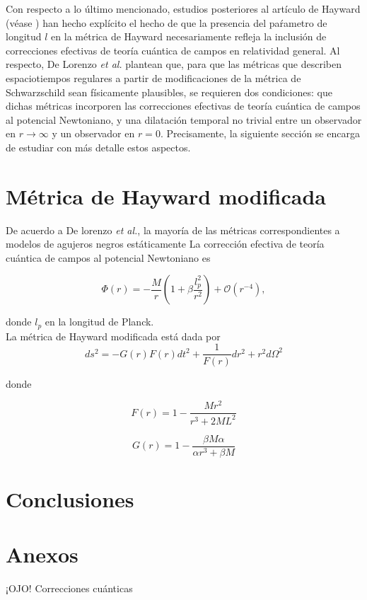 \documentclass{article}
\numberwithin{equation}{section}
\theoremstyle{definition}
\begin{document}
Con respecto a lo último mencionado, estudios posteriores al artículo de Hayward (véase \cite{lorenzo}) han hecho explícito el hecho de que la presencia del paŕametro de longitud $l$ en la métrica de Hayward necesariamente refleja la inclusión de correcciones efectivas de teoría cuántica de campos en relatividad general. Al respecto, De Lorenzo \emph{et al.} plantean que, para que las métricas que describen espaciotiempos regulares a partir de modificaciones de la métrica de Schwarzschild sean físicamente plausibles, se requieren dos condiciones: que dichas métricas incorporen las correcciones efectivas de teoría cuántica  de campos al potencial Newtoniano, y una dilatación temporal no trivial entre un observador en $r \to \infty$ y un observador en $r = 0$. Precisamente, la siguiente sección se encarga de estudiar con más detalle estos aspectos.

\section{Métrica de Hayward modificada}

De acuerdo a De lorenzo \emph{et al.}, la mayoría de las métricas correspondientes a modelos de agujeros negros estáticamente
La corrección efectiva de teoría cuántica de campos al potencial Newtoniano es

\begin{equation}
\label{newF}
\Phi (r) = -\frac{M}{r} \left( 1 + \beta \frac{l_{p}^2}{r^2} \right) + \mathcal{O}(r^{-4}),
\end{equation}

donde $l_{p}$ en la longitud de Planck.\\

La métrica de Hayward modificada está dada por 
\begin{equation}
\label{reg-schF}
ds^2 = -G(r)F(r) dt^2 + \frac{1}{F(r)} dr^2 + r^2d\Omega ^2
\end{equation}

donde

\begin{equation}
\label{mod-hay-f}
F(r) = 1 - \frac{Mr^2}{r^3 + 2ML^2}
\end{equation}

\begin{equation}
\label{mod-hay-g}
G(r) = 1 - \frac{\beta M \alpha}{\alpha r^3 + \beta M}
\end{equation}

\section{\label{conclusions} Conclusiones}

\section{\label{annex} Anexos}

¡OJO! Correcciones cuánticas\\





\end{document}
